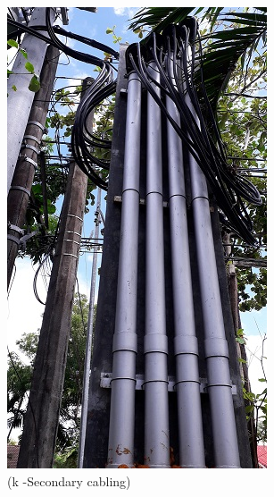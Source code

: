 \begin{figure}
\begin{minipage}[b]{0.22\linewidth}
	\includegraphics[width=\textwidth]{figures/R1P_visual/secodarycables}
	\caption*{(k -Secondary cabling)}
\end{minipage}
	\hspace{0.03cm}
\begin{minipage}[b]{0.22\linewidth}

\end{minipage}
\end{figure}
